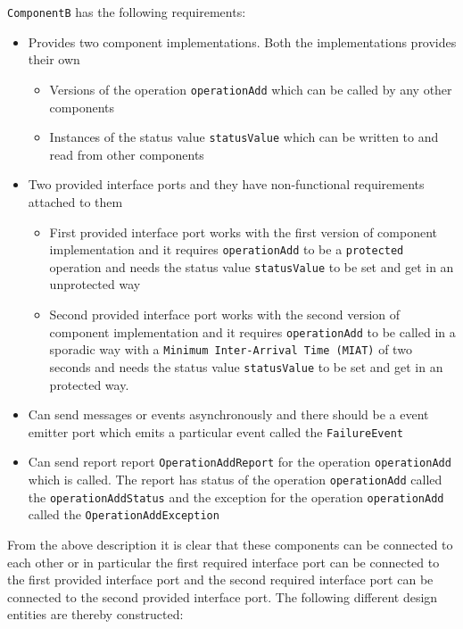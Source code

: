 \texttt{ComponentB} has the following requirements:
\begin{itemize}
\item Provides two component implementations. Both the implementations provides their own
\begin{itemize}
\item Versions of the operation \texttt{operationAdd} which can be called by any other components
\item Instances of the status value \texttt{statusValue} which can be written to and read from other components 
\end{itemize}

\item Two provided interface ports and they have non-functional requirements attached to them 
\begin{itemize}
\item First provided interface port works with the first version of component implementation and it requires \texttt{operationAdd} to be a \texttt{protected} operation and needs the status value \texttt{statusValue} to be set and get in an unprotected way
\item Second provided interface port works with the second version of component implementation and it requires \texttt{operationAdd} to be called in a sporadic way with a \texttt{Minimum Inter-Arrival Time (MIAT)} of two seconds and needs the status value \texttt{statusValue} to be set and get in an protected way.
\end{itemize}

\item Can send messages or events asynchronously and there should be a event emitter port which emits a particular event called the \texttt{FailureEvent}

\item Can send report report \texttt{OperationAddReport} for the operation \texttt{operationAdd} which is called. The report has status of the operation \texttt{operationAdd} called the \texttt{operationAddStatus} and the exception for the operation \texttt{operationAdd} called the \texttt{OperationAddException} 
\end{itemize}  

From the above description it is clear that these components can be connected to each other or in particular the first required interface port can be connected to the first provided interface port and the second required interface port can be connected to the second provided interface port. The following different design entities are thereby constructed:

